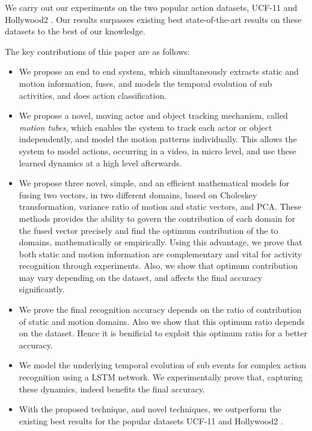 We carry out our experiments on the two popular action datasets, UCF-11 \cite{liu2009recognizing}
and Hollywood2 \cite{marszalek2009actions}. Our results surpasses existing best state-of-the-art
results on these datasets to the best of our knowledge.

The key contributions of this paper are as follows:

 \begin{itemize}
  \item We propose an end to end system, which simultaneously extracts static and motion information, fuses, and models the 
temporal evolution of sub activities, and does action classification. 
  \item We propose a novel, moving actor and object tracking mechanism, called \textit{motion tubes},
which enables the system to track each actor or object independently, and model the motion patterns individually. 
This allows the system to model actions, occurring in a video, in micro level, and use these learned dynamics
at a high level afterwards.
 \item We propose three novel, simple, and an efficient mathematical models for fusing two vectors, 
in two different 
domains, based on Choleskey transformation, variance ratio of motion and static vectors, and PCA. These methods provides 
the ability to govern the contribution of each domain
for the fused vector precisely and find the optimum contribution of the to domains, mathematically or empirically. Using this advantage, we prove that
both static and motion information are complementary and vital for activity recognition through experiments. Also, we show that optimum contribution 
may vary depending on the dataset, and affects the final accuracy significantly. 
 \item We prove the final recognition accuracy depends on the ratio of contribution of static and motion domains. Also we show that
 this optimum ratio depends on the dataset. Hence it is benificial to exploit this optimum ratio for a better accuracy. 
  \item We model the underlying 
temporal evolution of sub events for complex action recognition using a LSTM network. We experimentally 
prove that, capturing these dynamics, indeed benefits the final accuracy. 
\item With the proposed technique, and novel techniques,
we outperform the existing best results for the popular datasets UCF-11 \cite{liu2009recognizing}
and Hollywood2 \cite{marszalek2009actions}.
 \end{itemize}




